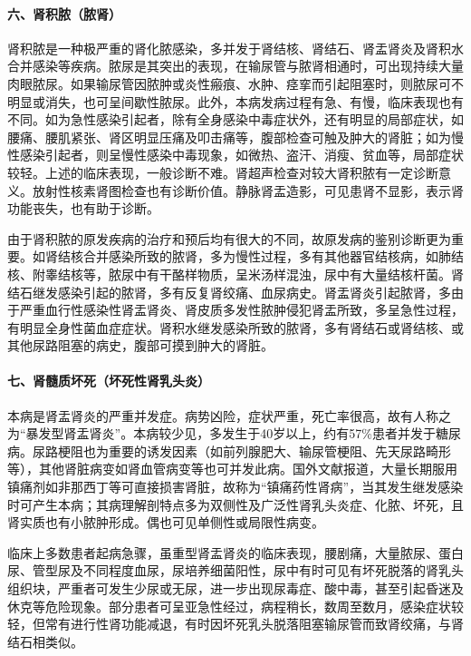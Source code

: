 \paragraph{六、肾积脓（脓肾）}

肾积脓是一种极严重的肾化脓感染，多并发于肾结核、肾结石、肾盂肾炎及肾积水合并感染等疾病。脓尿是其突出的表现，在输尿管与脓肾相通时，可出现持续大量肉眼脓尿。如果输尿管因脓肿或炎性瘢痕、水肿、痉挛而引起阻塞时，则脓尿可不明显或消失，也可呈间歇性脓尿。此外，本病发病过程有急、有慢，临床表现也有不同。如为急性感染引起者，除有全身感染中毒症状外，还有明显的局部症状，如腰痛、腰肌紧张、肾区明显压痛及叩击痛等，腹部检查可触及肿大的肾脏；如为慢性感染引起者，则呈慢性感染中毒现象，如微热、盗汗、消瘦、贫血等，局部症状较轻。上述的临床表现，一般诊断不难。肾超声检查对较大肾积脓有一定诊断意义。放射性核素肾图检查也有诊断价值。静脉肾盂造影，可见患肾不显影，表示肾功能丧失，也有助于诊断。

由于肾积脓的原发疾病的治疗和预后均有很大的不同，故原发病的鉴别诊断更为重要。如肾结核合并感染所致的脓肾，多为慢性过程，多有其他器官结核病，如肺结核、附睾结核等，脓尿中有干酪样物质，呈米汤样混浊，尿中有大量结核杆菌。肾结石继发感染引起的脓肾，多有反复肾绞痛、血尿病史。肾盂肾炎引起脓肾，多由于严重血行性感染性肾盂肾炎、肾皮质多发性脓肿侵犯肾盂所致，多呈急性过程，有明显全身性菌血症症状。肾积水继发感染所致的脓肾，多有肾结石或肾结核、或其他尿路阻塞的病史，腹部可摸到肿大的肾脏。

\paragraph{七、肾髓质坏死（坏死性肾乳头炎）}

本病是肾盂肾炎的严重并发症。病势凶险，症状严重，死亡率很高，故有人称之为“暴发型肾盂肾炎”。本病较少见，多发生于40岁以上，约有57\%患者并发于糖尿病。尿路梗阻也为重要的诱发因素（如前列腺肥大、输尿管梗阻、先天尿路畸形等），其他肾脏病变如肾血管病变等也可并发此病。国外文献报道，大量长期服用镇痛剂如非那西丁等可直接损害肾脏，故称为“镇痛药性肾病”，当其发生继发感染时可产生本病；其病理解剖特点多为双侧性及广泛性肾乳头炎症、化脓、坏死，且肾实质也有小脓肿形成。偶也可见单侧性或局限性病变。

临床上多数患者起病急骤，虽重型肾盂肾炎的临床表现，腰剧痛，大量脓尿、蛋白尿、管型尿及不同程度血尿，尿培养细菌阳性，尿中有时可见有坏死脱落的肾乳头组织块，严重者可发生少尿或无尿，进一步出现尿毒症、酸中毒，甚至引起昏迷及休克等危险现象。部分患者可呈亚急性经过，病程稍长，数周至数月，感染症状较轻，但常有进行性肾功能减退，有时因坏死乳头脱落阻塞输尿管而致肾绞痛，与肾结石相类似。

